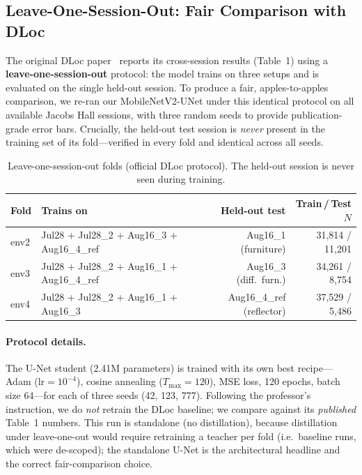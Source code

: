 \documentclass[11pt,a4paper]{article}
\begin{document}
\subsection{Leave-One-Session-Out: Fair Comparison with DLoc}
\label{sec:cross_loso}

The original DLoc paper~\cite{ayyalasomayajula2020deep} reports its cross-session results (Table~1) using a \textbf{leave-one-session-out} protocol: the model trains on three setups and is evaluated on the single held-out session.
To produce a fair, apples-to-apples comparison, we re-ran our MobileNetV2-UNet under this identical protocol on all available Jacobs Hall sessions, with three random seeds to provide publication-grade error bars.
Crucially, the held-out test session is \emph{never} present in the training set of its fold---verified in every fold and identical across all seeds.

\begin{table}[H]
\centering
\caption{Leave-one-session-out folds (official DLoc protocol). The held-out session is never seen during training.}
\label{tab:loso_folds}
\begin{tabular}{@{}llrr@{}}
\toprule
\textbf{Fold} & \textbf{Trains on} & \textbf{Held-out test} & \textbf{Train\,/\,Test $N$} \\
\midrule
env2 & Jul28 + Jul28\_2 + Aug16\_3 + Aug16\_4\_ref & Aug16\_1 (furniture)     & 31{,}814 / 11{,}201 \\
env3 & Jul28 + Jul28\_2 + Aug16\_1 + Aug16\_4\_ref & Aug16\_3 (diff.\ furn.)  & 34{,}261 / 8{,}754 \\
env4 & Jul28 + Jul28\_2 + Aug16\_1 + Aug16\_3      & Aug16\_4\_ref (reflector) & 37{,}529 / 5{,}486 \\
\bottomrule
\end{tabular}
\end{table}

\paragraph{Protocol details.}
The U-Net student (2.41M parameters) is trained with its own best recipe---Adam ($\text{lr} = 10^{-4}$), cosine annealing ($T_{\max} = 120$), MSE loss, 120 epochs, batch size 64---for each of three seeds (42, 123, 777).
Following the professor's instruction, we do \emph{not} retrain the DLoc baseline; we compare against its \emph{published} Table~1 numbers.
This run is standalone (no distillation), because distillation under leave-one-out would require retraining a teacher per fold (i.e.\ baseline runs, which were de-scoped); the standalone U-Net is the architectural headline and the correct fair-comparison choice.
\end{document}

